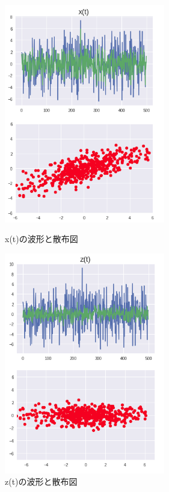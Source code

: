 \begin{figure}[htbp]
    \begin{minipage}{0.5\hsize}
     \begin{center}
      \includegraphics[width=70mm]{images/x(t).png}
     \end{center}
     \caption{x(t)の波形と散布図}
     \label{fig:x(t)}
    \end{minipage}
    \begin{minipage}{0.5\hsize}
     \begin{center}
      \includegraphics[width=70mm]{images/z(t).png}
     \end{center}
     \caption{z(t)の波形と散布図}
     \label{fig:z(t)}
    \end{minipage}
\end{figure}

